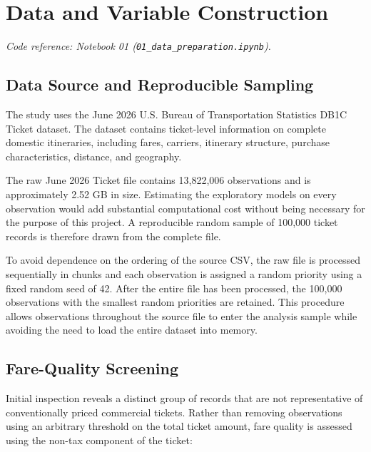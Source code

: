 \documentclass[11pt,a4paper]{article}
\begin{document}

\section{Data and Variable Construction}

\noindent\textit{Code reference: Notebook 01 (\texttt{01\_data\_preparation.ipynb}).}

\subsection{Data Source and Reproducible Sampling}

The study uses the June 2026 U.S. Bureau of Transportation Statistics DB1C Ticket dataset. The dataset contains ticket-level information on complete domestic itineraries, including fares, carriers, itinerary structure, purchase characteristics, distance, and geography.

The raw June 2026 Ticket file contains 13,822,006 observations and is approximately 2.52 GB in size. Estimating the exploratory models on every observation would add substantial computational cost without being necessary for the purpose of this project. A reproducible random sample of 100,000 ticket records is therefore drawn from the complete file.

To avoid dependence on the ordering of the source CSV, the raw file is processed sequentially in chunks and each observation is assigned a random priority using a fixed random seed of 42. After the entire file has been processed, the 100,000 observations with the smallest random priorities are retained. This procedure allows observations throughout the source file to enter the analysis sample while avoiding the need to load the entire dataset into memory.

\subsection{Fare-Quality Screening}

Initial inspection reveals a distinct group of records that are not representative of conventionally priced commercial tickets. Rather than removing observations using an arbitrary threshold on the total ticket amount, fare quality is assessed using the non-tax component of the ticket:
\end{document}
